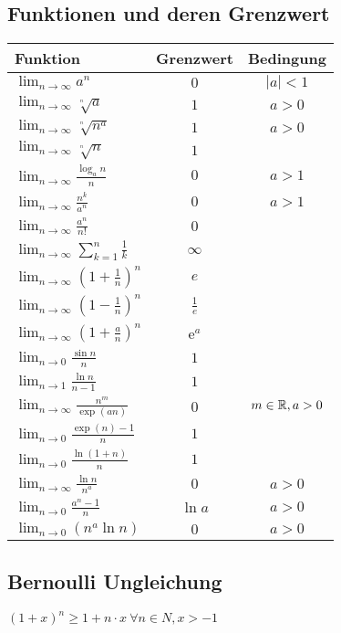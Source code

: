 \subsection{Funktionen und deren Grenzwert}
\begin{tabular}{l | c | c}
    Funktion & Grenzwert & Bedingung\\\hline
    $\lim_{n \to \infty} a^n$ & $0$ & $|a| < 1$\\\hline
    $\lim_{n \to \infty} \sqrt[^n]{a}$ & $1$ & $a > 0$\\\hline
    $\lim_{n \to \infty} \sqrt[^n]{n^a}$ & $1$ & $a > 0$\\\hline
    $\lim_{n \to \infty} \sqrt[^n]{n}$ & $1$\\\hline
    $\lim_{n \to \infty} \frac{\log_an}{n}$ & $0$ & $a > 1$\\\hline
    $\lim_{n \to \infty} \frac{n^k}{a^n}$ & $0$ & $a > 1$\\\hline
    $\lim_{n \to \infty} \frac{a^n}{n!}$ & $0$\\\hline
    $\lim_{n \to \infty} \sum_{k=1}^{n} \frac{1}{k}$ & $\infty$\\\hline
    $\lim_{n \to \infty} \left( 1 + \frac{1}{n} \right)^n$ & $e$\\\hline
    $\lim_{n \to \infty} \left( 1 - \frac{1}{n} \right)^n$ & $\frac{1}{e}$\\\hline
    $\lim_{n \to \infty} \left( 1 + \frac{a}{n} \right)^n$ &e$^a$\\\hline
    $\lim_{n \to 0} \frac{\sin n}{n}$ & $1$\\\hline
    $\lim_{n \to 1} \frac{\ln n}{n - 1}$ & $1$\\\hline
    $\lim_{n \to \infty} \frac{n^m}{\exp(an)}$ & $0$ & $m \in \mathbb{R}, a > 0$\\\hline
    $\lim_{n \to 0} \frac{\exp(n) - 1}{n}$ & $1$\\\hline
    $\lim_{n \to 0} \frac{\ln(1 + n)}{n}$ & $1$\\\hline
    $\lim_{n \to \infty} \frac{\ln n}{n^a}$ & $0$ & $a > 0$\\\hline
    $\lim_{n \to 0} \frac{a^n - 1}{n}$ & $\ln a$ & $a > 0$\\\hline
    $\lim_{n \to 0} (n^a \ln n)$ & $0$ & $a > 0$\\\hline
\end{tabular}

\subsection{Bernoulli Ungleichung}
$\left( 1 + x \right)^{n} \ge  1 + n \cdot x \ \forall n \in N, x > -1 $

